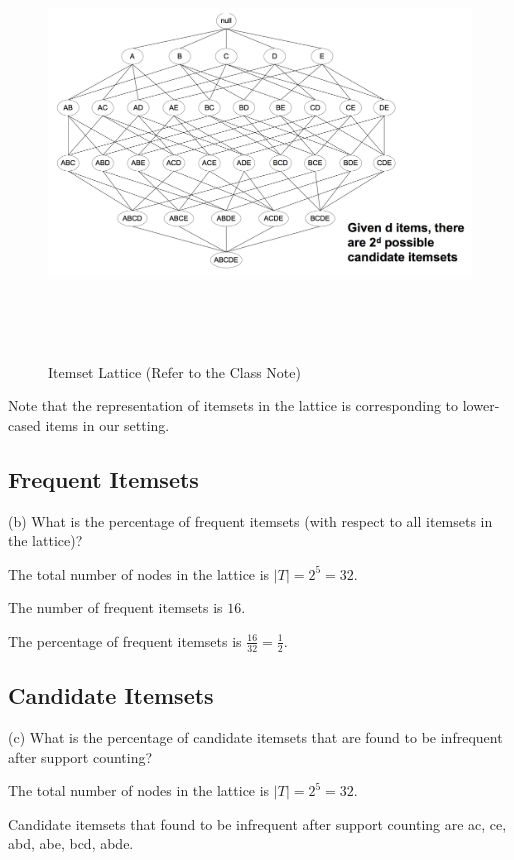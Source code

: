 \documentclass[11pt,a4paper]{article}
\begin{document}
\begin{figure}[h]
    \centering
    \includegraphics[width=6.5in,height=4.5in]{./lattice.png}
    \caption{Itemset Lattice (Refer to the Class Note)}
\end{figure}

Note that the representation of itemsets in the lattice is corresponding to
lower-cased items in our setting.

\subsection{Frequent Itemsets}
(b) What is the percentage of frequent itemsets (with respect to all itemsets
in the lattice)?

The total number of nodes in the lattice is $|T| = 2^{5} = 32$.

The number of frequent itemsets is $16$.

The percentage of frequent itemsets is $\frac{16}{32} = \frac{1}{2}$.

\subsection{Candidate Itemsets}
(c) What is the percentage of candidate itemsets that are found to be
infrequent after support counting?

The total number of nodes in the lattice is $|T| = 2^{5} = 32$.


Candidate itemsets that found to be infrequent after support counting are ac,
ce, abd, abe, bcd, abde. 
\end{document}
